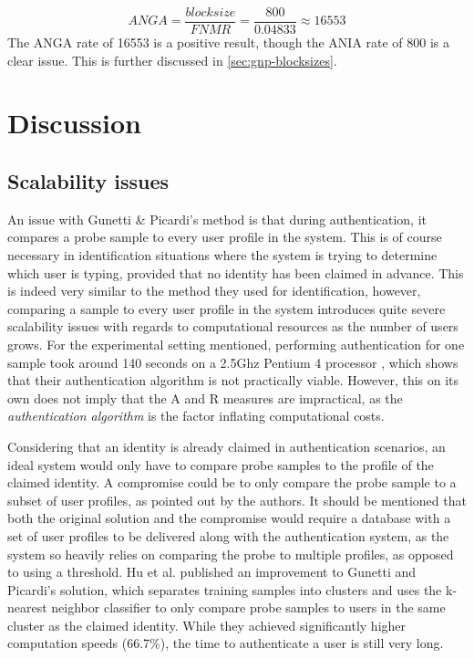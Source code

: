 \documentclass[informationsecurity]{gucmasterproject}
\begin{document}
\begin{equation}
ANGA = \frac{block size}{FNMR} = \frac{800}{0.04833} \approx 16553 
\end{equation}
The ANGA rate of 16553 is a positive result, though the ANIA rate of 800 is a clear issue.
This is further discussed in \autoref{sec:gnp-blocksizes}.

\section{Discussion}
\subsection{Scalability issues}
\label{sec:gnp-scalability}
An issue with Gunetti \& Picardi's method is that during authentication, it compares a probe sample to every user profile in the system.
This is of course necessary in identification situations where the system is trying to determine which user is typing, provided that no identity has been claimed in advance.
This is indeed very similar to the method they used for identification, however, comparing a sample to every user profile in the system introduces quite severe scalability issues with regards to computational resources as the number of users grows.
For the experimental setting mentioned, performing authentication for one sample took around 140 seconds on a 2.5Ghz Pentium 4 processor \cite{gnp}, which shows that their authentication algorithm is not practically viable.
However, this on its own does not imply that the A and R measures are impractical, as the \textit{authentication algorithm} is the factor inflating computational costs.

Considering that an identity is already claimed in authentication scenarios, an ideal system would only have to compare probe samples to the profile of the claimed identity.
A compromise could be to only compare the probe sample to a subset of user profiles, as pointed out by the authors.
It should be mentioned that both the original solution and the compromise would require a database with a set of user profiles to be delivered along with the authentication system, as the system so heavily relies on comparing the probe to multiple profiles, as opposed to using a threshold.
Hu et al. \cite{hu} published an improvement to Gunetti and Picardi's solution, which separates training samples into clusters and uses the k-nearest neighbor classifier to only compare probe samples to users in the same cluster as the claimed identity.
While they achieved significantly higher computation speeds (66.7\%), the time to authenticate a user is still very long.
\end{document}
